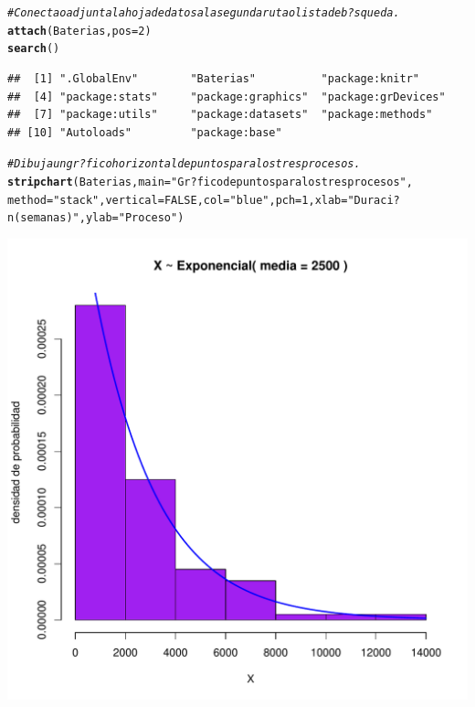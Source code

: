 \documentclass[10pt,a4paper]{article}\usepackage[]{graphicx}\usepackage[]{color}
\makeatletter
\def\maxwidth{ %
  \ifdim\Gin@nat@width>\linewidth
    \linewidth
  \else
    \Gin@nat@width
  \fi
}
\newcommand{\hlnum}[1]{\textcolor[rgb]{0.686,0.059,0.569}{#1}}%
\newcommand{\hlstr}[1]{\textcolor[rgb]{0.192,0.494,0.8}{#1}}%
\newcommand{\hlcom}[1]{\textcolor[rgb]{0.678,0.584,0.686}{\textit{#1}}}%
\newcommand{\hlstd}[1]{\textcolor[rgb]{0.345,0.345,0.345}{#1}}%
\newcommand{\hlkwc}[1]{\textcolor[rgb]{0.333,0.667,0.333}{#1}}%
\newcommand{\hlkwd}[1]{\textcolor[rgb]{0.737,0.353,0.396}{\textbf{#1}}}%
\newenvironment{kframe}{%
 \def\at@end@of@kframe{}%
 \ifinner\ifhmode%
  \def\at@end@of@kframe{\end{minipage}}%
  \begin{minipage}{\columnwidth}%
 \fi\fi%
 \def\FrameCommand##1{\hskip\@totalleftmargin \hskip-\fboxsep
 \colorbox{shadecolor}{##1}\hskip-\fboxsep
     \hskip-\linewidth \hskip-\@totalleftmargin \hskip\columnwidth}%
 \MakeFramed {\advance\hsize-\width
   \@totalleftmargin\z@ \linewidth\hsize
   \@setminipage}}%
 {\par\unskip\endMakeFramed%
 \at@end@of@kframe}
\newenvironment{knitrout}{}{} %
\makeatother
\begin{document}
\begin{knitrout}
\color{fgcolor}\begin{kframe}
\begin{alltt}
\hlcom{#Conecta o adjunta la hoja de datos a la segunda ruta o lista de b?squeda. }
\hlkwd{attach}\hlstd{(Baterias,} \hlkwc{pos}\hlstd{=}\hlnum{2}\hlstd{)}
\hlkwd{search}\hlstd{()}
\end{alltt}
\begin{verbatim}
##  [1] ".GlobalEnv"        "Baterias"          "package:knitr"    
##  [4] "package:stats"     "package:graphics"  "package:grDevices"
##  [7] "package:utils"     "package:datasets"  "package:methods"  
## [10] "Autoloads"         "package:base"
\end{verbatim}
\begin{alltt}
\hlcom{#Dibuja un gr?fico horizontal depuntos para los tres procesos. }
\hlkwd{stripchart}\hlstd{(Baterias,} \hlkwc{main}\hlstd{=}\hlstr{"Gr?fico de puntos para los tres procesos"}\hlstd{,}
\hlkwc{method} \hlstd{=} \hlstr{"stack"}\hlstd{,} \hlkwc{vertical} \hlstd{=} \hlnum{FALSE}\hlstd{,} \hlkwc{col}\hlstd{=}\hlstr{"blue"}\hlstd{,} \hlkwc{pch}\hlstd{=}\hlnum{1}\hlstd{,} \hlkwc{xlab}\hlstd{=}\hlstr{"Duraci?n (semanas)"}\hlstd{,} \hlkwc{ylab}\hlstd{=}\hlstr{"Proceso"}\hlstd{)}
\end{alltt}
\end{kframe}
\includegraphics[width=\maxwidth]{figure/unnamed-chunk-7-1} 

\end{knitrout}
\end{document}
